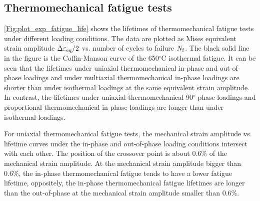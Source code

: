 \subsection{Thermomechanical fatigue tests}
\noindent
\ref{Fig:plot_exp_fatigue_life} shows the lifetimes of thermomechanical fatigue tests under different loading conditions. The data are plotted as Mises equivalent strain amplitude $\Delta\varepsilon_{\rm eq}/2$ vs. number of cycles to failure $N_{\rm f}$. The black solid line in the figure is the Coffin-Manson curve of the 650$^\circ$C isothermal fatigue. It can be seen that the lifetimes under uniaxial thermomechanical in-phase and out-of-phase loadings and under multiaxial thermomechanical in-phase loadings are shorter than under isothermal loadings at the same equivalent strain amplitude.
In contrast, the lifetimes under uniaxial thermomechanical 90$^\circ$ phase loadings and proportional thermomechanical in-phase loadings are longer than under isothermal loadings.

For uniaxial thermomechanical fatigue tests, the mechanical strain amplitude vs. lifetime curves under the in-phase and out-of-phase loading conditions intersect with each other. The position of the crossover point is about 0.6\% of the mechanical strain amplitude.
At the mechanical strain amplitude bigger than 0.6\%, the in-phase thermomechanical fatigue tends to have a lower fatigue lifetime, oppositely, the in-phase thermomechanical fatigue lifetimes are longer than the out-of-phase at the mechanical strain amplitude smaller than 0.6\%.



